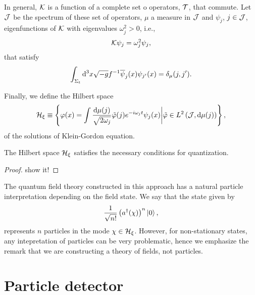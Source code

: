 In general, \({\mathcal{K}}\) is a function of a complete set o operators, \({\mathcal{T}}\), that commute. Let \({\mathcal{J}}\) be the spectrum of these set of operators, \(\mu\) a measure in \({\mathcal{J}}\) and \(\psi_j\), \(j\in{\mathcal{J}}\), eigenfunctions of \({\mathcal{K}}\) with eigenvalues \(\omega_j^2>0\), i.e.,
\begin{equation}
    {\mathcal{K}}\psi_j=\omega_j^2\psi_j,
\end{equation}
that satisfy
\begin{equation}
    \int_{\Sigma_t}\mathrm{d}^3x\sqrt{-g}f^{-1}\overline{\psi}_j(x)\psi_{j'}(x)=\delta_{\mu}(j,j').
\end{equation}

Finally, we define the Hilbert space
\begin{equation}
    {\mathcal{H}}_{\xi}\equiv\left\{\varphi(x)=\int\frac{\mathrm{d}\mu(j)}{\sqrt{2\omega_j}}\tilde{\varphi}(j)e^{-i\omega_j t}\psi_j(x)\bigg\vert \tilde{\varphi}\in L^2\left({\mathcal{J}}, \mathrm{d}\mu(j)\right)\right\},
\end{equation}
of the solutions of Klein-Gordon equation.
\begin{proposition}
    The Hilbert space \({\mathcal{H}}_{\xi}\) satisfies the necessary conditions for quantization.
\end{proposition}
\begin{proof}
    show it!
\end{proof}

The quantum field theory constructed in this approach has a natural particle interpretation depending on the field state. We say that the state given by
\begin{equation}
    \frac{1}{\sqrt{n!}}\left(a^{\dagger}(\chi)\right)^n\ket{0},
\end{equation}
represents \(n\) particles in the mode \(\chi\in{\mathcal{H}}_{\xi}\). However, for non-stationary states, any intepretation of particles can be very problematic, hence we emphasize the remark that we are constructing a theory of fields, not particles.

\section{Particle detector}

